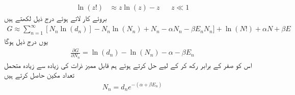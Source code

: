 \begin{align}
\ln(z !) &\approx z \ln(z) - z && z \ll 1
\end{align}
بروئے کار لاتے ہوئے درج ذیل لکھتے ہیں 
\begin{align}
G \approx \sum_{n = 1}^{\infty} [N_n \ln(d_n)] - N_n \ln(N_n) + N_n - \alpha N_n - \beta E_n N_n ] + \ln(N !) + \alpha N + \beta E
\end{align}
یوں درج ذیل ہوگا 
\begin{align}
\frac{\partial G}{\partial N_n} = \ln(d_n) - \ln(N_n) - \alpha - \beta E_n
\end{align}
اس کو صفر کے برابر رکھ کر  کے لیے حل کرتے ہوئے ہم قابل مميز ذرات کی زیادہ سے زیادہ متحمل تعداد مکین حاصل کرتے ہیں 
\begin{align} 
N_n = d_n e^{-(\alpha + \beta E_n)}
\end{align}


